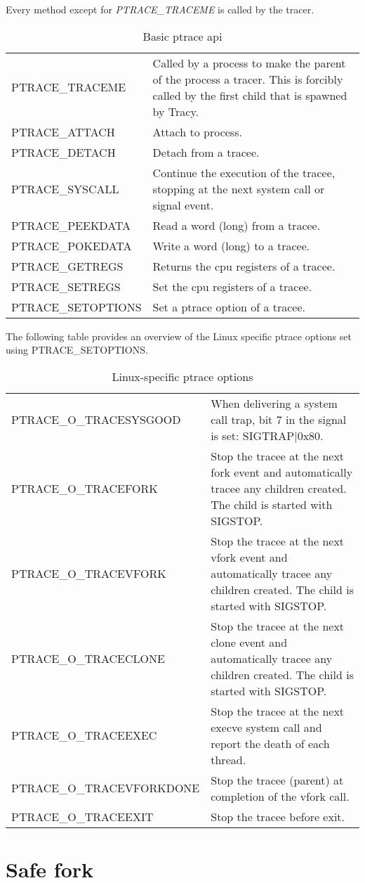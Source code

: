 \documentclass[a4paper, 10pt]{report}
\begin{document}
Every method except for \textit{PTRACE\_TRACEME} is called by the tracer.
\begin{table}[h!]
    \centering
    \begin{tabular}{|l|p{8cm}|}
    \hline
        PTRACE\_TRACEME & Called by a process to make the parent of the process
        a tracer. This is forcibly called by the first child that is
        spawned by Tracy. \\
        PTRACE\_ATTACH & Attach to process. \\
        PTRACE\_DETACH & Detach from a tracee. \\
        PTRACE\_SYSCALL & Continue the execution of the tracee,
        stopping at the next system call or signal event. \\
        PTRACE\_PEEKDATA & Read a word (long) from a tracee. \\
        PTRACE\_POKEDATA & Write a word (long) to a tracee. \\
        PTRACE\_GETREGS & Returns the cpu registers of a tracee. \\
        PTRACE\_SETREGS & Set the cpu registers of a tracee. \\
        PTRACE\_SETOPTIONS & Set a ptrace option of a tracee. \\
    \hline
    \end{tabular}
    \caption{Basic ptrace api}
    \label{tab:ptrace-api}
\end{table}

\newpage

The following table provides an overview of the Linux specific ptrace
options set using PTRACE\_SETOPTIONS.

\begin{table}[h!]
    \centering
    \begin{tabular}{|l|p{8cm}|}
    \hline
        PTRACE\_O\_TRACESYSGOOD & When delivering a system call trap, bit 7 in
    the signal is set: SIGTRAP$|$0x80.\\
        PTRACE\_O\_TRACEFORK & Stop the tracee at the next fork event and
    automatically tracee any children created. The child is started with
    SIGSTOP. \\
        PTRACE\_O\_TRACEVFORK & Stop the tracee at the next vfork event and
    automatically tracee any children created. The child is started with
    SIGSTOP. \\
        PTRACE\_O\_TRACECLONE & Stop the tracee at the next clone event and
    automatically tracee any children created. The child is started with
    SIGSTOP. \\
        PTRACE\_O\_TRACEEXEC & Stop the tracee at the next execve system call
    and report the death of each thread. \\
        PTRACE\_O\_TRACEVFORKDONE & Stop the tracee (parent) at completion
    of the vfork call. \\
        PTRACE\_O\_TRACEEXIT & Stop the tracee before exit. \\
    \hline
    \end{tabular}
    \caption{Linux-specific ptrace options}
    \label{tab:ptrace-opt}
\end{table}


\chapter{Safe fork}
\label{appendix:safefork-asm}

\end{document}
